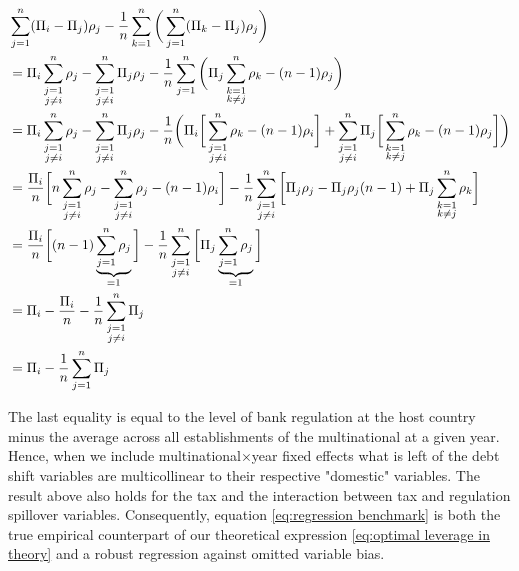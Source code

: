 \documentclass[12pt]{article}
\begin{document}
    \begin{equation*}
    \begin{aligned}
    &\sum_{j=1}^{n}(\Pi_i-\Pi_j)\rho_j-\frac{1}{n}\sum_{k=1}^{n}\bigg(\sum_{j=1}^{n}(\Pi_k-\Pi_j)\rho_j\bigg)\\
    &=\Pi_i\sum_{\mathclap{\substack{j=1\\j\neq i}}}^{n}\rho_j-\sum_{\mathclap{\substack{j=1\\j\neq i}}}^{n}\Pi_j\rho_j-\frac{1}{n}\sum_{j=1}^{n}\bigg(\Pi_j\sum_{\mathclap{\substack{k=1\\k\neq j}}}^{n}\rho_k-(n-1)\rho_j\bigg) \\
    &=\Pi_i\sum_{\mathclap{\substack{j=1\\j\neq i}}}^{n}\rho_j-\sum_{\mathclap{\substack{j=1\\j\neq i}}}^{n}\Pi_j\rho_j-\frac{1}{n}\bigg(\Pi_i\bigg[\sum_{\mathclap{\substack{j=1\\j\neq i}}}^{n} \rho_k-(n-1)\rho_i\bigg] + \sum_{\mathclap{\substack{j=1\\j\neq i}}}^{n} \Pi_j\bigg[ \sum_{\mathclap{\substack{k=1\\k\neq j}}}^{n} \rho_k - (n-1)\rho_j\bigg]\bigg) \\
    &=\frac{\Pi_i}{n}\bigg[n\sum_{\mathclap{\substack{j=1\\j\neq i}}}^{n}\rho_j-\sum_{\mathclap{\substack{j=1\\j\neq i}}}^{n}\rho_j-(n-1)\rho_i\bigg]-\frac{1}{n}\sum_{\mathclap{\substack{j=1\\j\neq i}}}^{n}\bigg[\Pi_j\rho_j-\Pi_j\rho_j(n-1) +\Pi_j\sum_{\mathclap{\substack{k=1\\k\neq j}}}^{n}\rho_k\bigg] \\
    &=\frac{\Pi_i}{n}\bigg[(n-1)\underbrace{\sum_{j=1}^{n}\rho_j}_{=1} \bigg]-\frac{1}{n}\sum_{\mathclap{\substack{j=1\\j\neq i}}}^{n}\bigg[\Pi_j\underbrace{\sum_{j=1}^{n}\rho_j}_{=1}\bigg] \\
    &=\Pi_i-\frac{\Pi_i}{n}-\frac{1}{n}\sum_{\mathclap{\substack{j=1\\j\neq i}}}^{n}\Pi_j \\
    &=\Pi_i-\frac{1}{n}\sum_{j=1}^{n}\Pi_j \\
    \end{aligned}
    \end{equation*} 
    
    The last equality is equal to the level of bank regulation at the host country minus the average across all establishments of the multinational at a given year. Hence, when we include multinational$\times$year fixed effects what is left of the debt shift variables are multicollinear to their respective "domestic" variables. The result above also holds for the tax and the interaction between tax and regulation spillover variables. Consequently, equation \ref{eq:regression benchmark} is both the true empirical counterpart of our theoretical expression \ref{eq:optimal leverage in theory} and a robust regression against omitted variable bias. 
       
\end{document}
